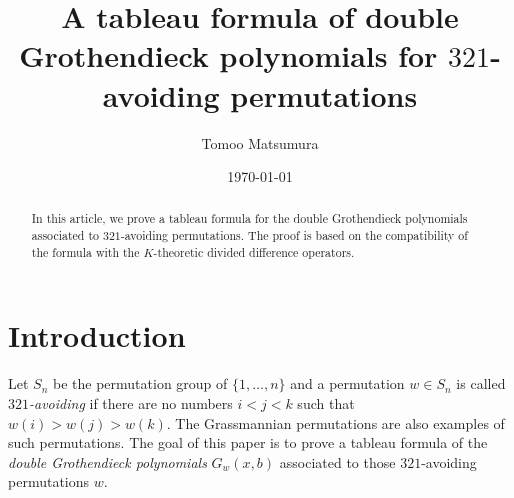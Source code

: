 \documentclass[11pt,reqno,sumlimits]{amsart}
\theoremstyle{definition}
\numberwithin{equation}{section}
\begin{document}
 
\title{A tableau formula of double Grothendieck polynomials for $321$-avoiding permutations}
\author{Tomoo Matsumura}


\pagestyle{plain}
\rhead{}

\date{\today}
\maketitle 
\begin{abstract}
In this article, we prove a tableau formula for the double Grothendieck polynomials associated to $321$-avoiding permutations. The proof is based on the compatibility of the formula with the $K$-theoretic divided difference operators.
\end{abstract}
\section{Introduction}

Let $S_n$ be the permutation group of $\{1,\dots, n\}$ and a permutation $w\in S_n$ is called {\it $321$-avoiding} if there are no numbers $i<j<k$ such that $w(i)>w(j)>w(k)$. The Grassmannian permutations are also examples of such permutations. The goal of this paper is to prove a tableau formula of the {\it double Grothendieck polynomials} $G_w(x,b)$ associated to those $321$-avoiding permutations $w$. 
\end{document}
